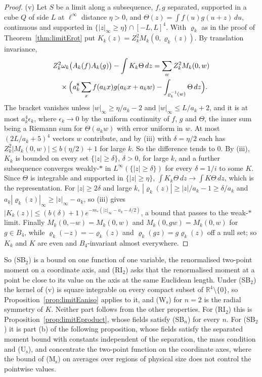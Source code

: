 \documentclass[aps,prd,twocolumn,superscriptaddress,nofootinbib,longbibliography,floatfix,amsmath,amssymb,10pt]{revtex4-2}
\theoremstyle{definition}
\theoremstyle{remark}
\newcommand{\R}{\mathbb{R}}
\begin{document}
\begin{proof}
(v) Let $S$ be a limit along a subsequence, $f,g$ separated, supported in a
cube $Q$ of side $L$ at $\ell^\infty$ distance $\eta>0$, and $\Theta(z)=\int
f(u)g(u+z)\,du$, continuous and supported in $\{|z|_\infty\ge\eta\}\cap
[-L,L]^4$. With $\varrho_k$ as in the proof of Theorem~\ref{thm:limitErot}
put $K_k(z)=Z_k^2M_k(0,\varrho_k(z))$. By translation invariance,
\[
\begin{split}
&Z_k^2\omega_k\bigl(A_k(f)A_k(g)\bigr)-\int K_k\Theta\,dz=\sum_wZ_k^2
M_k(0,w)\\
&\quad\times\Bigl(a_k^8\sum_xf(a_kx)g(a_kx+a_kw)-\int_{\varrho_k^{-1}(w)}
\Theta\,dz\Bigr) .
\end{split}
\]
The bracket vanishes unless $|w|_\infty\ge\eta/a_k-2$ and $|w|_\infty\le
L/a_k+2$, and it is at most $a_k^4\epsilon_k$, where $\epsilon_k\to0$ by
the uniform continuity of $f$, $g$ and $\Theta$, the inner sum being a
Riemann sum for $\Theta(a_kw)$ with error uniform in $w$. At most
$(2L/a_k+5)^4$ vectors $w$ contribute, and by (iii) with $\delta=\eta/2$
each has $Z_k^2|M_k(0,w)|\le b(\eta/2)+1$ for large $k$. So the difference
tends to $0$. By (iii), $K_k$ is bounded on every set $\{|z|\ge\delta\}$,
$\delta>0$, for large $k$, and a further subsequence converges weakly-$*$
in $L^\infty(\{|z|\ge\delta\})$ for every $\delta=1/i$ to some $K$. Since
$\Theta$ is integrable and supported in $\{|z|\ge\eta\}$, $\int K_k\Theta\,dz
\to\int K\Theta\,dz$, which is the representation. For $|z|\ge2\delta$ and
large $k$, $|\varrho_k(z)|\ge|z|/a_k-1\ge\delta/a_k$ and $a_k|\varrho_k(z)|
_\infty\ge|z|_\infty-a_k$, so (iii) gives $|K_k(z)|\le(b(\delta)+1)
e^{-m_*(|z|_\infty-a_k-\delta/2)}$, a bound that passes to the weak-$*$ limit.
Finally $M_k(0,-w)=M_k(0,w)$ and $M_k(0,gw)=M_k(0,w)$ for $g\in B_4$, while
$\varrho_k(-z)=-\varrho_k(z)$ and $\varrho_k(gz)=g\varrho_k(z)$ off a null
set; so $K_k$ and $K$ are even and $B_4$-invariant almost everywhere.
\end{proof}

So (SB$_2$) is a bound on one function of one variable, the renormalised
two-point moment on a coordinate axis, and (RI$_2$) asks that the
renormalised moment at a point be close to its value on the axis at the
same Euclidean length. Under (SB$_2$) the kernel of (v) is square
integrable on every compact subset of $\R^4\setminus\{0\}$, so
Proposition~\ref{prop:limitEaniso} applies to it, and (W$_{\mathrm s}$) for
$n=2$ is the radial symmetry of $K$. Neither part follows from the other
properties. For (RI$_2$) this is Proposition~\ref{prop:limitEproduct}, whose
fields satisfy (SB$_n$) for every $n$. For (SB$_2$) it is part (b) of the
following proposition, whose fields satisfy the separated moment bound with
constants independent of the separation, the mass condition and
(U$_{\mathrm s}$), and concentrate the two-point function on the coordinate
axes, where the bound of (M$_{\mathrm s}$) on averages over regions of
physical size does not control the pointwise values.
\end{document}

